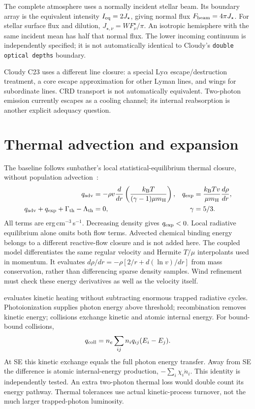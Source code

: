 \documentclass[10pt,a4paper]{article}
\newcommand{\kb}{k_{\mathrm B}}
\newcommand{\mh}{m_{\mathrm H}}
\begin{document}
The complete atmosphere uses a normally incident stellar beam. Its boundary
array is the equivalent intensity $I_{\rm eq}=2J_\star$, giving normal flux
$F_{\rm beam}=4\pi J_\star$. For stellar surface flux and dilution,
$J_{\star,\nu}=W F^\star_\nu/\pi$. An isotropic hemisphere with the same
incident mean has half that normal flux. The lower incoming continuum is
independently specified; it is not automatically identical to Cloudy's
\texttt{double optical depths} boundary.

Cloudy C23 uses a different line closure: a special Ly$\alpha$
escape/destruction treatment, a core escape approximation for other Lyman
lines, and wings for subordinate lines. CRD transport is not automatically
equivalent. Two-photon emission currently escapes as a cooling channel;
its internal reabsorption is another explicit adequacy question.

\section{Thermal advection and expansion}
The baseline follows sunbather's local statistical-equilibrium thermal
closure, without population advection~\cite{sunbather}:
\begin{align}
 q_{\rm adv}&=-\rho v\frac{d}{dr}
      \left(\frac{\kb T}{(\gamma-1)\mu\mh}\right),
 &q_{\rm exp}&=\frac{\kb T v}{\mu\mh}\frac{d\rho}{dr},\notag\\
 q_{\rm adv}+q_{\rm exp}+\Gamma_{\rm th}-\Lambda_{\rm th}&=0,
 &\gamma&=5/3.
 \label{eq:thermal}
\end{align}
All terms are erg\,cm$^{-3}$\,s$^{-1}$. Decreasing density gives
$q_{\rm exp}<0$. Local radiative equilibrium alone omits both flow terms.
Advected chemical binding energy belongs to a different reactive-flow
closure and is not added here.
The coupled model differentiates the same regular velocity and Hermite
$T/\mu$ interpolants used in momentum. It evaluates
$d\rho/dr=-\rho[2/r+d(\ln v)/dr]$ from mass conservation, rather than
differencing sparse density samples. Wind refinement must check these
energy derivatives as well as the velocity itself.

 evaluates kinetic heating
without subtracting enormous trapped radiative cycles. Photoionization
supplies photon energy above threshold; recombination removes kinetic energy;
collisions exchange kinetic and atomic internal energy. For bound-bound
collisions,
\begin{equation}
 q_{\rm coll}=n_e\sum_{ij}n_iq_{ij}(E_i-E_j).
 \label{eq:collheat}
\end{equation}
At SE this kinetic exchange equals the full photon energy transfer. Away
from SE the difference is atomic internal-energy production,
$-\sum_i\chi_i\dot n_i$. This identity is independently tested.
An extra two-photon thermal loss would double count its energy pathway.
Thermal tolerances use actual kinetic-process turnover, not the much larger
trapped-photon luminosity.
\end{document}

